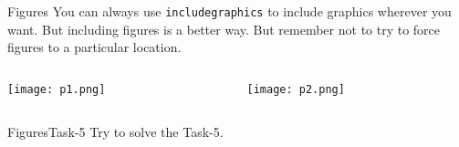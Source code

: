 \begin{frame}{Figures}
  You can always use \texttt{includegraphics} to include graphics wherever you want. But including figures is a better way. But remember not to try to force figures to a particular location. \vspace{1em}

  \begin{columns}
    \begin{column}{0.5\textwidth}
      \texttt{[image: p1.png]}
    \end{column}
    \begin{column}{0.5\textwidth}
      \texttt{[image: p2.png]}
    \end{column}
  \end{columns}
\end{frame}

\begin{frame}{Figures}{Task-5}
    Try to solve the Task-5.
\end{frame}
